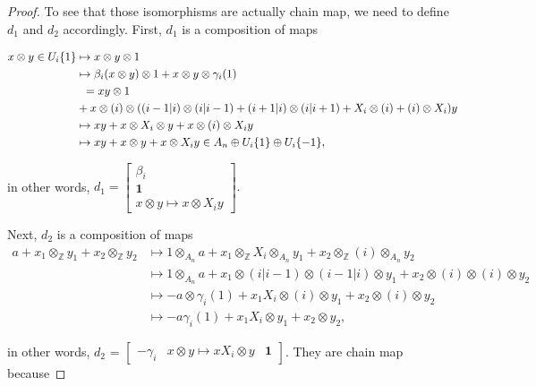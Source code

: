 \documentclass[psamsfonts,a4paper]{amsart}
\theoremstyle{plain}
\numberwithin{equation}{section}
\numberwithin{figure}{section}
\newcommand{\Z}{{\mathbb Z}}
\renewcommand{\b}{\beta}
\newcommand{\tb}{\textbf}
\newcommand{\ot}{\otimes}
\newcommand{\op}{\oplus}
\newcommand{\<}{\langle}
\renewcommand{\>}{\rangle}
\theoremstyle{named}
\theoremstyle{name}
\begin{document}
\begin{proof}
	To see that those isomorphisms are actually chain map, we need to define $d_1$ and $d_2$ accordingly. 
	First, $d_1$ is a composition of maps 
	
\begin{align*}
x \ot y \in U_i\{1\} 
&\mapsto x \ot y \ot 1  \\
&\mapsto \b_i(x \ot y) \ot 1 + x \ot y \ot \gamma_i(1)  \\
& \hspace{2mm} = xy \ot 1 \\
&  + x \ot (i) \ot ((i-1|i)\ot (i|i-1) + (i+1|i)\ot(i|i+1) + X_i\ot(i) + (i)\ot X_i)y \\
& \mapsto xy + x \ot X_i \ot y + x \ot (i) \ot X_iy \\
& \mapsto xy + x \ot y + x \ot X_iy \in  A_n  \op U_i\{1\} \op U_i\{-1\},
\end{align*}

\noindent in other words, $d_1 = \begin{bmatrix}
\b_i \\ \textbf{1} \\ x \ot y \mapsto x \ot X_i y
\end{bmatrix}.$

Next, $d_2$ is a composition of maps 
\begin{align*}
a + x_1 \otimes_{\Z} y_1 + x_2 \otimes_{\Z} y_2 
& \mapsto 1 \otimes_{A_n} a + x_1 \otimes_{\Z} X_i \otimes_{A_n} y_1 + x_2 \otimes_{\Z} (i) \otimes_{A_n} y_2 \\
& \mapsto 1 \ot_{A_n} a + x_1 \ot (i| i-1) \ot (i-1|i) \ot y_1 + x_2 \ot (i) \ot (i) \ot y_2 \\
&\mapsto -  a \ot \gamma_i(1) + x_1X_i \ot (i) \ot y_1 + x_2 \ot (i) \ot y_2 \\
& \mapsto -a \gamma_i(1) + x_1X_i \ot y_1 + x_2 \ot y_2,
\end{align*}

\noindent in other words, $d_2$ = $\begin{bmatrix}
-\gamma_i & x \ot y \mapsto xX_i \ot y & \tb{1}
\end{bmatrix}$.
	They are chain map because
	

\end{proof}
\end{document}
